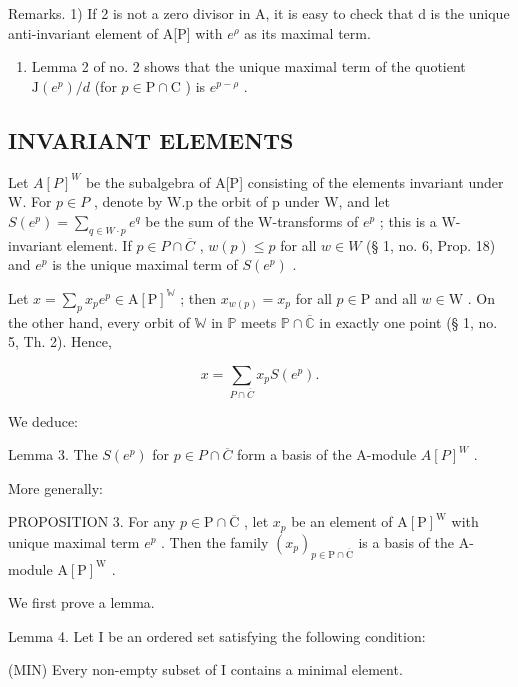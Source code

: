Remarks. 1) If 2 is not a zero divisor in A, it is easy to check that d is the unique anti-invariant element of A{[}P{]} with \(e^{\rho}\) as its maximal term.

\begin{enumerate}
\def\labelenumi{\arabic{enumi})}
\setcounter{enumi}{1}
\tightlist
\item
  Lemma 2 of no. 2 shows that the unique maximal term of the quotient \(\mathrm{J}(e^p) / d\) (for \(p\in \mathrm{P}\cap \mathrm{C}\) ) is \(e^{p - \rho}\) .
\end{enumerate}

\subsection{INVARIANT ELEMENTS}

Let \(A[P]^W\) be the subalgebra of A{[}P{]} consisting of the elements invariant under W. For \(p \in P\) , denote by W.p the orbit of p under W, and let \(S(e^p) = \sum_{q \in W \cdot p} e^q\) be the sum of the W-transforms of \(e^p\) ; this is a W-invariant element. If \(p \in P \cap \overline{C}\) , \(w(p) \leqslant p\) for all \(w \in W\) (§ 1, no. 6, Prop. 18) and \(e^p\) is the unique maximal term of \(S(e^p)\) .

Let \(x = \sum_{p} x_{p} e^{p} \in \mathrm{A}[\mathrm{P}]^{\mathbb{W}}\) ; then \(x_{w(p)} = x_{p}\) for all \(p \in \mathrm{P}\) and all \(w \in \mathrm{W}\) . On the other hand, every orbit of \(\mathbb{W}\) in \(\mathbb{P}\) meets \(\mathbb{P} \cap \overline{\mathbb{C}}\) in exactly one point (§ 1, no. 5, Th. 2). Hence,

\[
x = \sum_ {P \cap \overline {{C}}} x _ {p} S (e ^ {p}).\tag{6}
\]

We deduce:

Lemma 3. The \(S(e^p)\) for \(p \in P \cap \overline{C}\) form a basis of the A-module \(A[P]^W\) .

More generally:

PROPOSITION 3. For any \(p \in \mathrm{P} \cap \overline{\mathrm{C}}\) , let \(x_p\) be an element of \(\mathrm{A}[\mathrm{P}]^{\mathrm{W}}\) with unique maximal term \(e^p\) . Then the family \((x_p)_{p \in \mathrm{P} \cap \overline{\mathrm{C}}}\) is a basis of the A-module \(\mathrm{A}[\mathrm{P}]^{\mathrm{W}}\) .

We first prove a lemma.

Lemma 4. Let I be an ordered set satisfying the following condition:

(MIN) Every non-empty subset of I contains a minimal element.

